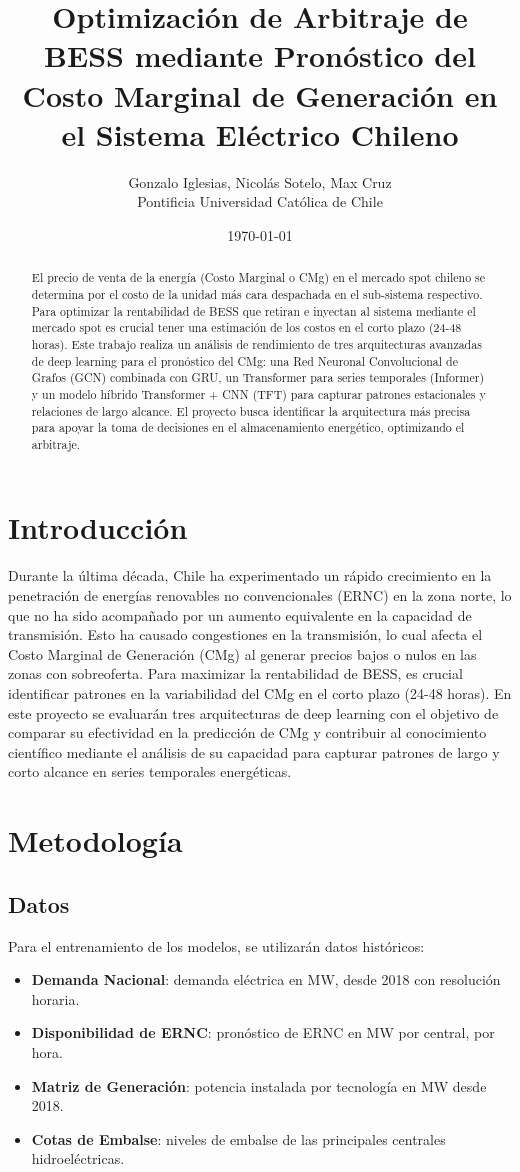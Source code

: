 \documentclass[twocolumn]{article}
\title{Optimización de Arbitraje de BESS mediante Pronóstico del Costo Marginal de Generación en el Sistema Eléctrico Chileno}
\author{Gonzalo Iglesias, Nicolás Sotelo, Max Cruz  \\
	Pontificia Universidad Católica de Chile  \\
	}
\date{\today}
\begin{document}
\maketitle

\begin{abstract}
El precio de venta de la energía (Costo Marginal o CMg) en el mercado spot chileno se determina por el costo de la unidad más cara despachada en el sub-sistema respectivo. Para optimizar la rentabilidad de BESS que retiran e inyectan al sistema mediante el mercado spot es crucial tener una estimación de los costos en el corto plazo (24-48 horas). Este trabajo realiza un análisis de rendimiento de tres arquitecturas avanzadas de deep learning para el pronóstico del CMg: una Red Neuronal Convolucional de Grafos (GCN) combinada con GRU, un Transformer para series temporales (Informer) y un modelo híbrido Transformer + CNN (TFT) para capturar patrones estacionales y relaciones de largo alcance. El proyecto busca identificar la arquitectura más precisa para apoyar la toma de decisiones en el almacenamiento energético, optimizando el arbitraje.
\end{abstract}

\section{Introducción}
Durante la última década, Chile ha experimentado un rápido crecimiento en la penetración de energías renovables no convencionales (ERNC) en la zona norte, lo que no ha sido acompañado por un aumento equivalente en la capacidad de transmisión. Esto ha causado congestiones en la transmisión, lo cual afecta el Costo Marginal de Generación (CMg) al generar precios bajos o nulos en las zonas con sobreoferta. Para maximizar la rentabilidad de BESS, es crucial identificar patrones en la variabilidad del CMg en el corto plazo (24-48 horas). En este proyecto se evaluarán tres arquitecturas de deep learning con el objetivo de comparar su efectividad en la predicción de CMg y contribuir al conocimiento científico mediante el análisis de su capacidad para capturar patrones de largo y corto alcance en series temporales energéticas.

\section{Metodología}
\subsection{Datos}
Para el entrenamiento de los modelos, se utilizarán datos históricos:
\begin{itemize}
    \item \textbf{Demanda Nacional}: demanda eléctrica en MW, desde 2018 con resolución horaria.
    \item \textbf{Disponibilidad de ERNC}: pronóstico de ERNC en MW por central, por hora.
    \item \textbf{Matriz de Generación}: potencia instalada por tecnología en MW desde 2018.
    \item \textbf{Cotas de Embalse}: niveles de embalse de las principales centrales hidroeléctricas.
\end{itemize}
\end{document}
